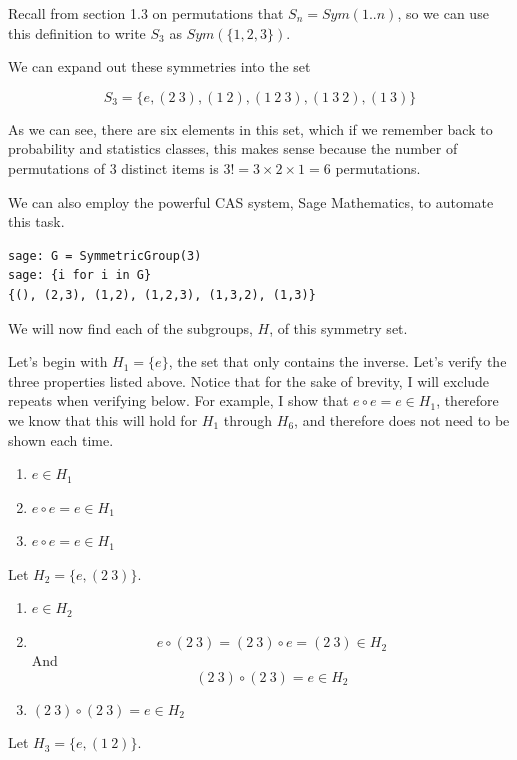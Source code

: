 \documentclass[a4paper]{article}
\begin{document}
\begin{myparindent}{0pt}
Recall from section 1.3 on permutations that $S_n = \textit{Sym}({1..n})$, so we
can use this definition to write $S_3$ as $\textit{Sym}(\{1, 2, 3\})$. \newline

We can expand out these symmetries into the set

\[ S_3 = \{e, (2 ~3), (1 ~2), (1 ~2 ~3), (1 ~3 ~2), (1 ~3) \} \]

As we can see, there are six elements in this set, which if we remember back to
probability and statistics classes, this makes sense because the number of
permutations of $3$ distinct items is $3! = 3 \times 2 \times 1 = 6$ permutations. \newline

We can also employ the powerful CAS system, Sage Mathematics, to automate this task.
\begin{verbatim}
sage: G = SymmetricGroup(3)
sage: {i for i in G}
{(), (2,3), (1,2), (1,2,3), (1,3,2), (1,3)}
\end{verbatim}

We will now find each of the subgroups, $H$, of this symmetry set. \newline

Let's begin with $H_1 = \{e\}$, the set that only contains the inverse. Let's
verify the three properties listed above. Notice that for the sake of brevity,
I will exclude repeats when verifying below. For example, I show that
$e \circ e = e \in H_1$, therefore we know that this will hold for $H_1$
through $H_6$, and therefore does not need to be shown each time. \newline

\begin{enumerate}
  \item $e \in H_1$
  \item $e \circ e = e \in H_1$
  \item $e \circ e = e \in H_1$
\end{enumerate}

Let $H_2 = \{e, (2 ~3)\}$.

\begin{enumerate}
  \item $e \in H_2$
  \item
  \[ e \circ (2 ~3) = (2 ~3) \circ e = (2 ~3) \in H_2 \]
  And
  \[ (2 ~3) \circ (2 ~3) = e \in H_2 \]
  \item $(2 ~3) \circ (2 ~3) = e \in H_2$
\end{enumerate}

Let $H_3 = \{e, (1 ~2)\}$.


\end{myparindent}
\end{document}
